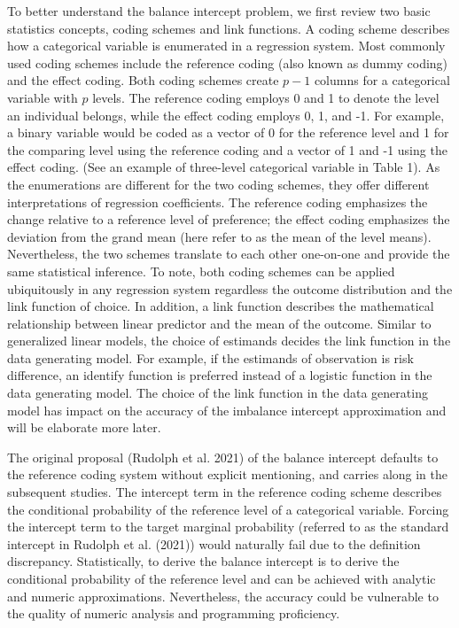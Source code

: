 \documentclass[
]{article}
\begin{document}
To better understand the balance intercept problem, we first review two
basic statistics concepts, coding schemes and link functions. A coding
scheme describes how a categorical variable is enumerated in a
regression system. Most commonly used coding schemes include the
reference coding (also known as dummy coding) and the effect coding.
Both coding schemes create \(p-1\) columns for a categorical variable
with \(p\) levels. The reference coding employs 0 and 1 to denote the
level an individual belongs, while the effect coding employs 0, 1, and
-1. For example, a binary variable would be coded as a vector of 0 for
the reference level and 1 for the comparing level using the reference
coding and a vector of 1 and -1 using the effect coding. (See an example
of three-level categorical variable in Table 1). As the enumerations are
different for the two coding schemes, they offer different
interpretations of regression coefficients. The reference coding
emphasizes the change relative to a reference level of preference; the
effect coding emphasizes the deviation from the grand mean (here refer
to as the mean of the level means). Nevertheless, the two schemes
translate to each other one-on-one and provide the same statistical
inference. To note, both coding schemes can be applied ubiquitously in
any regression system regardless the outcome distribution and the link
function of choice. In addition, a link function describes the
mathematical relationship between linear predictor and the mean of the
outcome. Similar to generalized linear models, the choice of estimands
decides the link function in the data generating model. For example, if
the estimands of observation is risk difference, an identify function is
preferred instead of a logistic function in the data generating model.
The choice of the link function in the data generating model has impact
on the accuracy of the imbalance intercept approximation and will be
elaborate more later.



The original proposal (Rudolph et al. 2021) of the balance intercept
defaults to the reference coding system without explicit mentioning, and
carries along in the subsequent studies. The intercept term in the
reference coding scheme describes the conditional probability of the
reference level of a categorical variable. Forcing the intercept term to
the target marginal probability (referred to as the standard intercept
in Rudolph et al. (2021)) would naturally fail due to the definition
discrepancy. Statistically, to derive the balance intercept is to derive
the conditional probability of the reference level and can be achieved
with analytic and numeric approximations. Nevertheless, the accuracy
could be vulnerable to the quality of numeric analysis and programming
proficiency.
\end{document}
